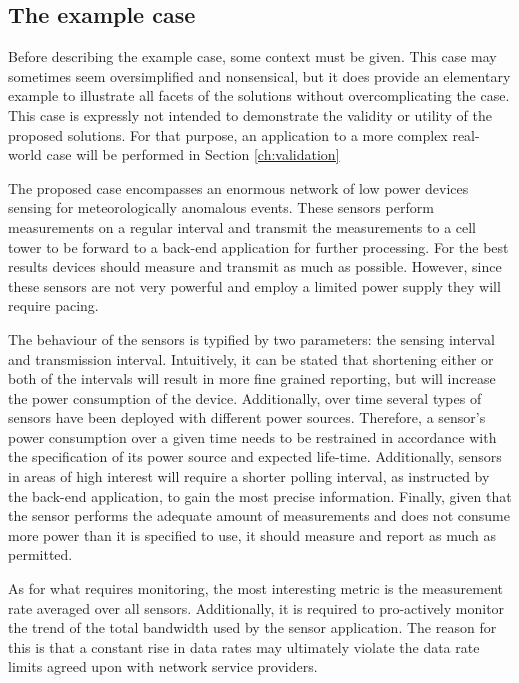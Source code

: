 \subsection{The example case}
\label{sec:example_case}
Before describing the example case, some context must be given. This case may sometimes seem oversimplified and nonsensical, but it does provide an elementary example to illustrate all facets of the solutions without overcomplicating the case. This case is expressly not intended to demonstrate the validity or utility of the proposed solutions. For that purpose, an application to a more complex real-world case will be performed in Section \ref{ch:validation}

The proposed case encompasses an enormous network of low power devices sensing for meteorologically anomalous events. These sensors perform measurements on a regular interval and transmit the measurements to a cell tower to be forward to a back-end application for further processing. For the best results devices should measure and transmit as much as possible. However, since these sensors are not very powerful and employ a limited power supply they will require pacing.

The behaviour of the sensors is typified by two parameters: the sensing interval and transmission interval. Intuitively, it can be stated that shortening either or both of the intervals will result in more fine grained reporting, but will increase the power consumption of the device. Additionally, over time several types of sensors have been deployed with different power sources. Therefore, a sensor's power consumption over a given time needs to be restrained in accordance with the specification of its power source and expected life-time. Additionally, sensors in areas of high interest will require a shorter polling interval, as instructed by the back-end application, to gain the most precise information. Finally, given that the sensor performs the adequate amount of measurements and does not consume more power than it is specified to use, it should measure and report as much as permitted.

As for what requires monitoring, the most interesting metric is the measurement rate averaged over all sensors. Additionally, it is required to pro-actively monitor the trend of the total bandwidth used by the sensor application. The reason for this is that a constant rise in data rates may ultimately violate the data rate limits agreed upon with network service providers.

